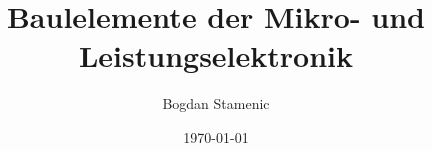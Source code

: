 

\newcommand{\FormelsammlungTitel}{Baulelemente der Mikro- und Leistungselektronik}
\newcommand{\FormelsammlungAutor}{Bogdan Stamenic}
\setcounter{tocdepth}{2} %


	\title{\FormelsammlungTitel}
	\author{\FormelsammlungAutor}
	\date{\today}
	\begin{multicols*}{2}
			\maketitle
			\tableofcontents
        
        
        
	\end{multicols*}

